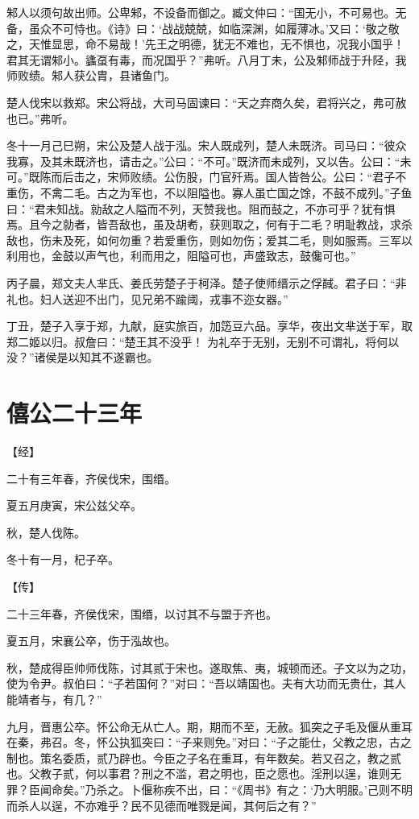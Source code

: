 \documentclass[a4paper,12pt,UTF8,twoside]{ctexbook}
\begin{document}
邾人以须句故出师。公卑邾，不设备而御之。臧文仲曰：“国无小，不可易也。无备，虽众不可恃也。《诗》曰：‘战战兢兢，如临深渊，如履薄冰。’又曰：‘敬之敬之，天惟显思，命不易哉！’先王之明德，犹无不难也，无不惧也，况我小国乎！君其无谓邾小。蠭虿有毒，而况国乎？”弗听。八月丁未，公及邾师战于升陉，我师败绩。邾人获公胄，县诸鱼门。

楚人伐宋以救郑。宋公将战，大司马固谏曰：“天之弃商久矣，君将兴之，弗可赦也已。”弗听。



冬十一月己巳朔，宋公及楚人战于泓。宋人既成列，楚人未既济。司马曰：“彼众我寡，及其未既济也，请击之。”公曰：“不可。”既济而未成列，又以告。公曰：“未可。”既陈而后击之，宋师败绩。公伤股，门官歼焉。国人皆咎公。公曰：“君子不重伤，不禽二毛。古之为军也，不以阻隘也。寡人虽亡国之馀，不鼓不成列。”子鱼曰：“君未知战。勍敌之人隘而不列，天赞我也。阻而鼓之，不亦可乎？犹有惧焉。且今之勍者，皆吾敌也，虽及胡耇，获则取之，何有于二毛？明耻教战，求杀敌也，伤未及死，如何勿重？若爱重伤，则如勿伤；爱其二毛，则如服焉。三军以利用也，金鼓以声气也，利而用之，阻隘可也，声盛致志，鼓儳可也。”

丙子晨，郑文夫人芈氏、姜氏劳楚子于柯泽。楚子使师缙示之俘馘。君子曰：“非礼也。妇人送迎不出门，见兄弟不踰阈，戎事不迩女器。”

丁丑，楚子入享于郑，九献，庭实旅百，加笾豆六品。享华，夜出文芈送于军，取郑二姬以归。叔詹曰：“楚王其不没乎！ 为礼卒于无别，无别不可谓礼，将何以没？”诸侯是以知其不遂霸也。


\section{僖公二十三年}



【经】

二十有三年春，齐侯伐宋，围缗。

夏五月庚寅，宋公兹父卒。

秋，楚人伐陈。

冬十有一月，杞子卒。

【传】

二十三年春，齐侯伐宋，围缗，以讨其不与盟于齐也。

夏五月，宋襄公卒，伤于泓故也。

秋，楚成得臣帅师伐陈，讨其贰于宋也。遂取焦、夷，城顿而还。子文以为之功，使为令尹。叔伯曰：“子若国何？”对曰：“吾以靖国也。夫有大功而无贵仕，其人能靖者与，有几？”

九月，晋惠公卒。怀公命无从亡人。期，期而不至，无赦。狐突之子毛及偃从重耳在秦，弗召。冬，怀公执狐突曰：“子来则免。”对曰：“子之能仕，父教之忠，古之制也。策名委质，贰乃辟也。今臣之子名在重耳，有年数矣。若又召之，教之贰也。父教子贰，何以事君？刑之不滥，君之明也，臣之愿也。淫刑以逞，谁则无罪？臣闻命矣。”乃杀之。卜偃称疾不出，曰：“《周书》有之：‘乃大明服。’己则不明而杀人以逞，不亦难乎？民不见德而唯戮是闻，其何后之有？”
\end{document}
